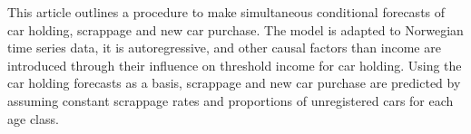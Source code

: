 This article outlines a procedure to make simultaneous conditional forecasts of car holding, scrappage and new car purchase. The model is adapted to Norwegian time series data, it is autoregressive, and other causal factors than income are introduced through their influence on threshold income for car holding. Using the car holding forecasts as a basis, scrappage and new car purchase are predicted by assuming constant scrappage rates and proportions of unregistered cars for each age class.
